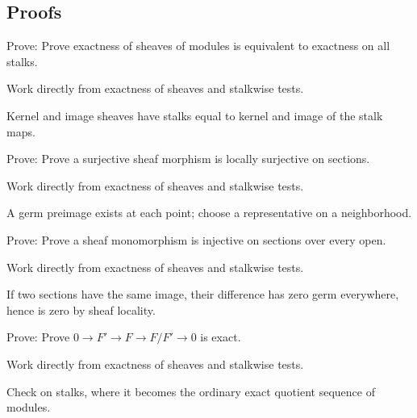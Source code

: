 \subsection*{Proofs}

\begin{exercise}\label{exr:vi16-expand-06}
Prove: Prove exactness of sheaves of modules is equivalent to exactness on all stalks.
\end{exercise}
\begin{hint}
Work directly from exactness of sheaves and stalkwise tests.
\end{hint}
\begin{solution}
Kernel and image sheaves have stalks equal to kernel and image of the stalk maps.
\end{solution}

\begin{exercise}\label{exr:vi16-expand-07}
Prove: Prove a surjective sheaf morphism is locally surjective on sections.
\end{exercise}
\begin{hint}
Work directly from exactness of sheaves and stalkwise tests.
\end{hint}
\begin{solution}
A germ preimage exists at each point; choose a representative on a neighborhood.
\end{solution}

\begin{exercise}\label{exr:vi16-expand-08}
Prove: Prove a sheaf monomorphism is injective on sections over every open.
\end{exercise}
\begin{hint}
Work directly from exactness of sheaves and stalkwise tests.
\end{hint}
\begin{solution}
If two sections have the same image, their difference has zero germ everywhere, hence is zero by sheaf locality.
\end{solution}

\begin{exercise}\label{exr:vi16-expand-09}
Prove: Prove $0\to F'\to F\to F/F'\to0$ is exact.
\end{exercise}
\begin{hint}
Work directly from exactness of sheaves and stalkwise tests.
\end{hint}
\begin{solution}
Check on stalks, where it becomes the ordinary exact quotient sequence of modules.
\end{solution}

